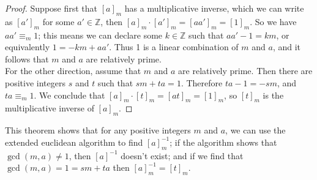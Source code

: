 \documentclass{report}
\theoremstyle{definition}
\begin{document}
\begin{proof}
Suppose first that $[a]_m$ has a multiplicative inverse, which we can write as $[a']_m$ for some $a'\in\mathbb Z$, then $[a]_m\cdot[a']_m=[aa']_m=[1]_m$. So we have $aa'\equiv_m1$; this means
we can declare some $k\in\mathbb Z$ such that $aa'-1=km$, or equivalently 
$1=-km+aa'$. Thus 1 is a linear combination of $m$ and $a$, and it follows that $m$ and $a$ are relatively prime.\\
\indent For the other direction, assume that $m$ and $a$ are relatively prime. Then there are positive integers $s$ and $t$ such that $sm+ta=1$. Therefore $ta-1=-sm$, and $ta\equiv_m1$.
We conclude that $[a]_m\cdot[t]_m=[at]_m=[1]_m$, so $[t]_m$ is the multiplicative inverse of $[a]_m$.
\end{proof}
\noindent This theorem shows that for any positive integers $m$ and $a$, we can use the extended euclidean algorithm to find $[a]_m^{-1}$; if the algorithm shows that $\gcd(m,a)\neq1$, then
$[a]^{-1}$ doesn't exist; and if we find that $\gcd(m,a)=1=sm+ta$ then $[a]_m^{-1}=[t]_m$.
\newpage
\end{document}
